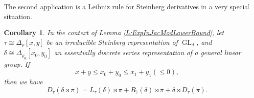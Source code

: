 \documentclass[11pt,letterpaper]{amsart}
\theoremstyle{plain}
\newcounter{theorem}[section]
\numberwithin{theorem}{section}
\numberwithin{equation}{subsection}
\newtheorem{Cor}[theorem]{Corollary}
\theoremstyle{remark}
\newcommand{\GL}{\operatorname{GL}}
\begin{document}
\vskip 5pt

The second application is a Leibniz rule for Steinberg derivatives in a very special situation.

\begin{Cor}\label{leibniz-st}
In the context of Lemma \ref{L:ExpInJacModLowerBound}, let $\tau\cong\Delta_\rho[x,y]$ be an irreducible Steinberg representation of $\GL_d$, and $\delta\cong\Delta_{\rho_0}[x_0,y_0]$ an essentially discrete series representation of a general linear group. If
\[
    x+y\leq x_0+y_0\leq x_1+y_1 (\leq 0),
\]
then we have
\[
    D_\tau\left(\delta\rtimes\pi\right) = L_\tau\left(\delta\right)\rtimes \pi + R_{\widetilde{\tau}}\left(\delta\right)\rtimes \pi + \delta\rtimes D_\tau\left(\pi\right).
\]
\end{Cor}

\vskip 5pt
\end{document}
